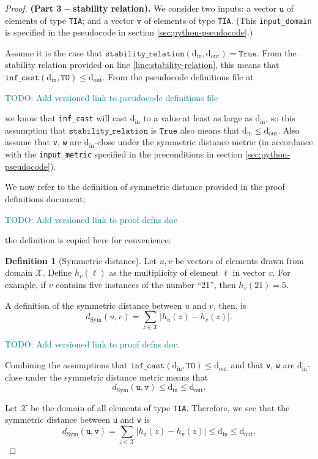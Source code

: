 \documentclass[12pt,letterpaper]{article}
\newcommand{\din}{\mathrm{d_{in}}}
\newcommand{\dout}{\mathrm{d_{out}}}
\newcommand{\True}{\texttt{True}}
\newcommand{\todo}[1]{{\begin{center} \textcolor{teal}{{\huge TODO:} #1}\end{center}}}
\theoremstyle{definition}
\newtheorem{definition}{Definition}[section]
\begin{document}
\begin{proof} \textbf{(Part 3 -- stability relation).} We consider two inputs: a vector $\texttt{u}$ of elements of type \texttt{TIA}; and a vector $\texttt{v}$ of elements of type \texttt{TIA}. (This \texttt{input\_domain} is specified in the pseudocode in section \ref{sec:python-pseudocode}.)

Assume it is the case that $\texttt{stability\_relation}(\din, \dout) = \True$. From  the stability relation provided on line \ref{line:stability-relation}, this means that $\texttt{inf\_cast}(\din, \texttt{TO}) \leq \dout$. From the pseudocode definitions file at

\todo{Add versioned link to pseudocode definitions file}

we know that \texttt{inf\_cast} will cast $\din$ to a value at least as large as $\din$, so this assumption that $\texttt{stability\_relation}$ is $\True$ also means that $\din \leq \dout$. Also assume that \texttt{v}, \texttt{w} are $\din$-close under the symmetric distance metric (in accordance with the \texttt{input\_metric} specified in the preconditions in section \ref{sec:python-pseudocode}).

We now refer to the definition of symmetric distance provided in the proof definitions document;
\todo{Add versioned link to proof defns doc}
the definition is copied here for convenience:

\begin{definition}[Symmetric distance]
\label{defn:symm-dist}
Let $u,v$ be vectors of elements drawn from domain $\mathcal{X}$. Define $h_v(\ell)$ as the multiplicity of element $\ell$ in vector $v$. For example, if $v$ contains five instances of the number ``21'', then $h_v(21) = 5$.

A definition of the symmetric distance between $u$ and $v$, then, is $$d_{\text{Sym}}(u,v) = \sum_{z\in \mathcal{X}} |h_u(z) - h_v(z)|.$$
\end{definition}

\todo{Add versioned link to proof defns doc.}

Combining the assumptions that $\texttt{inf\_cast}(\din, \texttt{TO}) \leq \dout$ and that \texttt{v}, \texttt{w} are $\din$-close under the symmetric distance metric means that
\begin{equation}
    d_\text{Sym}(\texttt{u}, \texttt{v})
    \leq \din \leq \dout.
\end{equation}

Let $\mathcal{X}$ be the domain of all elements of type \texttt{TIA}. Therefore, we see that the symmetric distance  between \texttt{u} and \texttt{v} is 
\begin{equation}
\label{eq:expand-dymm-dist}
    d_\text{Sym}(\texttt{u}, \texttt{v}) = \sum_{z\in \mathcal{X}} |h_{\texttt{u}}(z) - h_{\texttt{v}}(z)| \leq \din \leq \dout.
\end{equation}


\end{proof}
\end{document}
